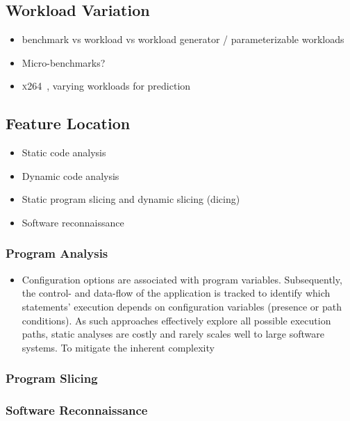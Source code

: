 \documentclass[conference]{IEEEtran}
\begin{document}
\subsection{Workload Variation}
\begin{itemize}
	\item benchmark vs workload vs workload generator / parameterizable workloads
	\item Micro-benchmarks?
	\item \textsc{x264}~\cite{alves_sampling_2020}, varying workloads for prediction~\cite{liao_2020_using_emse}
\end{itemize}
\subsection{Feature Location}
\begin{itemize}
	\item Static code analysis\cite{velez_2020_configcrusher_jase,lillack_2018_lotrack_tse,luo_2019_cova}
	\item Dynamic code analysis \cite{bell_phosphor_2014,velez_comprex_2021}
	\item Static program slicing and dynamic slicing (dicing)
	\item Software reconnaissance ~\cite{wong_integrated_2005,wilde_early_1996,agrawal_fault_1995,simmons_industrial_2006,chen_dynamic_nodate,sherwood_reducing_nodate}
\end{itemize}

\subsubsection{Program Analysis}
\begin{itemize}
	\item Configuration options are associated with program variables. Subsequently, the control- and data-flow of the application is tracked to identify which statements' execution depends on configuration variables (presence or path conditions). As such approaches effectively explore all possible execution paths, static analyses are costly and rarely scales well to large software systems. To mitigate the inherent complexity
\end{itemize}
\subsubsection{Program Slicing}
\subsubsection{Software Reconnaissance}
\end{document}
